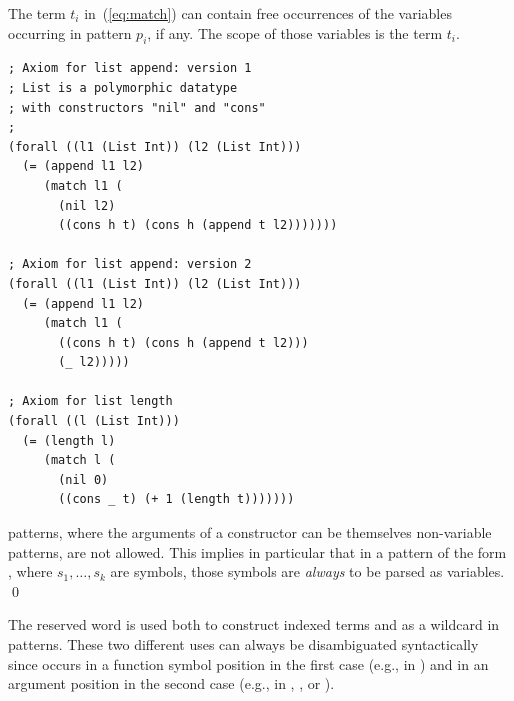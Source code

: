 The term $t_i$ in~(\ref{eq:match}) can contain free occurrences 
of the variables occurring in pattern $p_i$, if any.
The scope of those variables is the term $t_i$.

\begin{lstlisting}[linewidth=29em]
; Axiom for list append: version 1
; List is a polymorphic datatype 
; with constructors "nil" and "cons"
;
(forall ((l1 (List Int)) (l2 (List Int)))
  (= (append l1 l2)
     (match l1 (
       (nil l2)
       ((cons h t) (cons h (append t l2)))))))

; Axiom for list append: version 2
(forall ((l1 (List Int)) (l2 (List Int)))
  (= (append l1 l2)
     (match l1 (
       ((cons h t) (cons h (append t l2)))
       (_ l2)))))

; Axiom for list length
(forall ((l (List Int)))
  (= (length l)
     (match l (
       (nil 0)
       ((cons _ t) (+ 1 (length t)))))))
\end{lstlisting}

\begin{remark}
 patterns, where the arguments of a constructor can be themselves
non-variable patterns, are not allowed.
This implies in particular that in a pattern of the form ,
where $s_1, \ldots, s_k$ are symbols, those symbols are \emph{always} to be parsed as variables.
\qed
\end{remark}

\begin{remark}
The reserved word \ter{\_} is used both to construct indexed terms 
and as a wildcard in  patterns.
These two different uses can always be disambiguated syntactically
since \ter{\_} occurs in a function symbol position in the first case 
(e.g., in )
and in an argument position in the second case
(e.g., in , , or ).
\end{remark}

